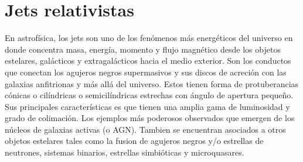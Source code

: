 \documentclass[12pt,a4paper]{book}
\begin{document}
\section{Jets relativistas}
En astrofísica, los jets son uno de los fenómenos más energéticos del universo en donde concentra masa, energía, momento y flujo magnético desde los objetos estelares, 
galácticos y extragalácticos hacia el medio exterior. Son los conductos que conectan los agujeros negros supermasivos y sus discos de acreción con las galaxias anfitrionas y más allá del universo.
Estos tienen forma de protuberancias cónicas o cilíndricas 
o semicilíndricas estrechas con ángulo de apertura pequeño. Sus principales características es que tienen una 
amplia gama de luminosidad y grado de colimación. 
Los ejemplos más poderosos observados que emergen de los núcleos de galaxias activas (o AGN). Tambien se encuentran asociados a otros objetos estelares tales como la fusion de agujeros negros y/o
estrellas de neutrones, sistemas binarios, estrellas simbióticas y microquasares. %

\end{document}
